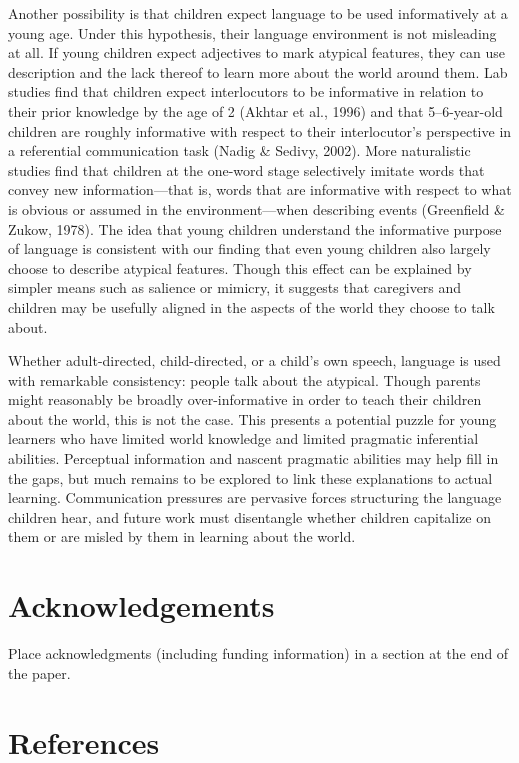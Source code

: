 \documentclass[10pt, letterpaper]{article}
\begin{document}
Another possibility is that children expect language to be used
informatively at a young age. Under this hypothesis, their language
environment is not misleading at all. If young children expect
adjectives to mark atypical features, they can use description and the
lack thereof to learn more about the world around them. Lab studies find
that children expect interlocutors to be informative in relation to
their prior knowledge by the age of 2 (Akhtar et al., 1996) and that
5--6-year-old children are roughly informative with respect to their
interlocutor's perspective in a referential communication task (Nadig \&
Sedivy, 2002). More naturalistic studies find that children at the
one-word stage selectively imitate words that convey new
information---that is, words that are informative with respect to what
is obvious or assumed in the environment---when describing events
(Greenfield \& Zukow, 1978). The idea that young children understand the
informative purpose of language is consistent with our finding that even
young children also largely choose to describe atypical features. Though
this effect can be explained by simpler means such as salience or
mimicry, it suggests that caregivers and children may be usefully
aligned in the aspects of the world they choose to talk about.

Whether adult-directed, child-directed, or a child's own speech,
language is used with remarkable consistency: people talk about the
atypical. Though parents might reasonably be broadly over-informative in
order to teach their children about the world, this is not the case.
This presents a potential puzzle for young learners who have limited
world knowledge and limited pragmatic inferential abilities. Perceptual
information and nascent pragmatic abilities may help fill in the gaps,
but much remains to be explored to link these explanations to actual
learning. Communication pressures are pervasive forces structuring the
language children hear, and future work must disentangle whether
children capitalize on them or are misled by them in learning about the
world.

\hypertarget{acknowledgements}{%
\section{Acknowledgements}\label{acknowledgements}}

Place acknowledgments (including funding information) in a section at
the end of the paper.

\hypertarget{references}{%
\section{References}\label{references}}
\end{document}
